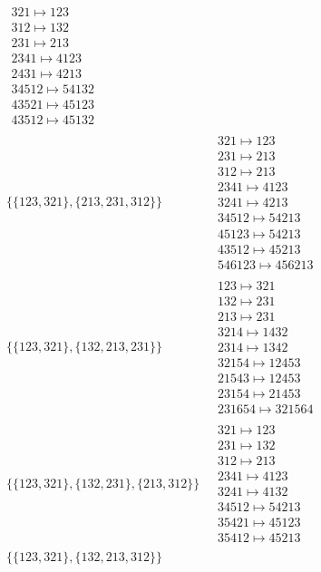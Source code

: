 \begin{scriptsize}
\begin{align}
\begin{matrix}
321 \mapsto 123\\312 \mapsto 132\\231 \mapsto 213\\2341 \mapsto 4123\\2431 \mapsto 4213\\34512 \mapsto 54132\\43521 \mapsto 45123\\43512 \mapsto 45132
\end{matrix}
\\
\{\{123, 321\}, \{213, 231, 312\}\}
\ 
&
\begin{matrix}
321 \mapsto 123\\231 \mapsto 213\\312 \mapsto 213\\2341 \mapsto 4123\\3241 \mapsto 4213\\34512 \mapsto 54213\\45123 \mapsto 54213\\43512 \mapsto 45213\\546123 \mapsto 456213
\end{matrix}
\\
\{\{123, 321\}, \{132, 213, 231\}\}
\ 
&
\begin{matrix}
123 \mapsto 321\\132 \mapsto 231\\213 \mapsto 231\\3214 \mapsto 1432\\2314 \mapsto 1342\\32154 \mapsto 12453\\21543 \mapsto 12453\\23154 \mapsto 21453\\231654 \mapsto 321564
\end{matrix}
\\
\{\{123, 321\}, \{132, 231\}, \{213, 312\}\}
\ 
&
\begin{matrix}
321 \mapsto 123\\231 \mapsto 132\\312 \mapsto 213\\2341 \mapsto 4123\\3241 \mapsto 4132\\34512 \mapsto 54213\\35421 \mapsto 45123\\35412 \mapsto 45213
\end{matrix}
\\
\{\{123, 321\}, \{132, 213, 312\}\}
\ 
&
\begin{matrix}

\end{matrix}
\end{align}
\end{scriptsize}
